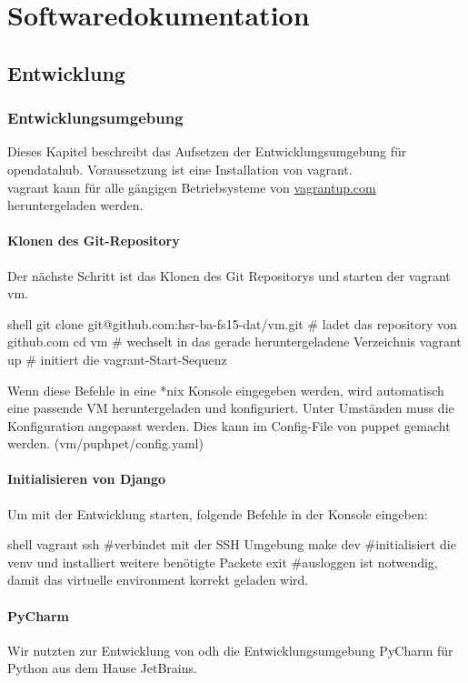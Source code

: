 \part{Softwaredokumentation}
\chapter{Entwicklung}

\section{Entwicklungsumgebung}
Dieses Kapitel beschreibt das Aufsetzen der Entwicklungsumgebung für opendatahub. Voraussetzung ist eine Installation von \acs{vagrant}.
\\
\acs{vagrant} kann für alle gängigen Betriebsysteme von \url{vagrantup.com} heruntergeladen werden.


\subsection{Klonen des Git-Repository}
Der nächste Schritt ist das Klonen des Git Repositorys und starten der vagrant vm.
\begin{src}{shell}
git clone git@github.com:hsr-ba-fs15-dat/vm.git  # ladet das repository von github.com
cd vm  # wechselt in das gerade heruntergeladene Verzeichnis
vagrant up  # initiert die \ac{vagrant}-Start-Sequenz
\end{src}
Wenn diese Befehle in eine *nix Konsole eingegeben werden, wird automatisch eine passende VM heruntergeladen und konfiguriert. Unter Umständen muss die Konfiguration angepasst werden. Dies kann im Config-File von puppet gemacht werden. (vm/puphpet/config.yaml)


\subsection{Initialisieren von Django}
Um mit der Entwicklung starten, folgende Befehle in der Konsole eingeben:
\begin{src}{shell}
vagrant ssh #verbindet mit der SSH Umgebung
make dev #initialisiert die venv und installiert weitere benötigte Packete
exit #ausloggen ist notwendig, damit das virtuelle environment korrekt geladen wird.
\end{src}
\subsection{PyCharm}
Wir nutzten zur Entwicklung von \acf{odh} die Entwicklungsumgebung \acs{PyCharm} für Python aus dem Hause JetBrains.
